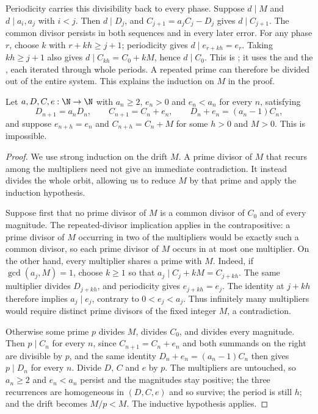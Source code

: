 Periodicity carries this divisibility back to every phase. Suppose
$d\mid M$ and $d\mid a_i,a_j$ with $i<j$. Then $d\mid D_j$, and
$C_{j+1}=a_jC_j-D_j$ gives $d\mid C_{j+1}$. The common divisor
persists in both sequences and in every later error. For any phase $r$,
choose $k$ with $r+kh\ge j+1$; periodicity gives
$d\mid e_{r+kh}=e_r$. Taking $kh\ge j+1$ also gives
$d\mid C_{kh}=C_0+kM$, hence $d\mid C_0$. This is
; it uses the
and the
, each iterated through whole periods.
A repeated prime can therefore be divided out of the entire system.
This explains the induction on $M$ in the proof.

\begin{theorem}\label{long243:res:periodic}
Let $a,D,C,e:\N\to\N$ with $a_n\ge2$, $e_n>0$ and $e_n<a_n$ for every $n$,
satisfying
\[
 D_{n+1}=a_nD_n,\qquad C_{n+1}=C_n+e_n,\qquad D_n+e_n=(a_n-1)C_n ,
\]
and suppose $e_{n+h}=e_n$ and $C_{n+h}=C_n+M$ for some $h>0$ and $M>0$.  This
is impossible.
\end{theorem}

\begin{proof}
We use strong induction on the drift $M$. A prime divisor of $M$ that
recurs among the multipliers need not give an immediate contradiction.
It instead divides the whole orbit, allowing us to reduce $M$ by that
prime and apply the induction hypothesis.

Suppose first that no prime divisor of $M$ is a common divisor of $C_0$ and of
every magnitude.  The repeated-divisor implication applies in the
contrapositive: a prime divisor of $M$ occurring in two of the multipliers
would be exactly such a common divisor, so each prime divisor of $M$ occurs in
at most one multiplier.  On the other hand, every multiplier shares a prime with $M$.
Indeed, if $\gcd(a_j,M)=1$, choose $k\ge1$ so that
$a_j\mid C_j+kM=C_{j+kh}$. The same multiplier divides $D_{j+kh}$,
and periodicity gives $e_{j+kh}=e_j$. The identity at $j+kh$
therefore implies $a_j\mid e_j$, contrary to $0<e_j<a_j$.
Thus infinitely many multipliers would require distinct prime divisors
of the fixed integer $M$, a contradiction.

Otherwise some prime $p$ divides $M$, divides $C_0$, and divides every
magnitude.  Then $p\mid C_n$ for every $n$, since $C_{n+1}=C_n+e_n$ and both
summands on the right are divisible by $p$, and the same identity
$D_n+e_n=(a_n-1)C_n$ then gives $p\mid D_n$ for every $n$.  Divide $D$, $C$ and
$e$ by $p$.  The multipliers are untouched, so $a_n\ge2$ and $e_n<a_n$ persist
and the magnitudes stay positive; the three recurrences are homogeneous in
$(D,C,e)$ and so survive; the period is still $h$; and the drift becomes
$M/p<M$.  The inductive hypothesis applies.
\end{proof}

